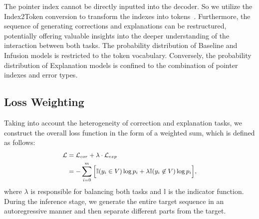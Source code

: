 The pointer index cannot be directly inputted into the decoder. So we utilize the Index2Token conversion to transform the indexes into tokens~\citep{yan-etal-2021-unified-generative}. Furthermore, the sequence of generating corrections and explanations can be restructured, potentially offering valuable insights into the deeper understanding of the interaction between both tasks. The probability distribution of Baseline and Infusion models is restricted to the token vocabulary. Conversely, the probability distribution of Explanation models is confined to the combination of pointer indexes and error types.


\subsection{Loss Weighting}
\label{subsec:loss_weighting}

Taking into account the heterogeneity of correction and explanation tasks, we construct the overall loss function in the form of a weighted sum, which is defined as follows:
\begin{equation}\begin{small}\begin{aligned}
\mathcal{L} &= \mathcal{L}_{cor} + \lambda \cdot \mathcal{L}_{exp} \\
&= -\sum^m_{i=0} \Big[ \mathbb{I}(y_i \in V)\log p_i + \lambda \mathbb{I}(y_i \not\in V) \log p_i \Big],
\end{aligned}\label{eq:loss}\end{small}\end{equation}
\noindent where $\lambda$ is responsible for balancing both tasks and $\mathbb{I}$ is the indicator function. During the inference stage, we generate the entire target sequence in an autoregressive manner and then separate different parts from the target.
